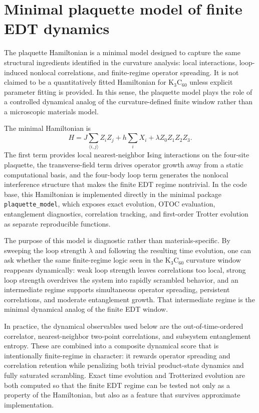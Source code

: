 \section{Minimal plaquette model of finite EDT dynamics}

The plaquette Hamiltonian is a minimal model designed to capture the same structural ingredients identified in the curvature analysis: local interactions, loop-induced nonlocal correlations, and finite-regime operator spreading. It is not claimed to be a quantitatively fitted Hamiltonian for K$_3$C$_{60}$ unless explicit parameter fitting is provided. In this sense, the plaquette model plays the role of a controlled dynamical analog of the curvature-defined finite window rather than a microscopic materials model.

The minimal Hamiltonian is
\begin{equation}
H =
J \sum_{\langle i,j\rangle} Z_i Z_j
+
h \sum_i X_i
+
\lambda Z_0 Z_1 Z_2 Z_3.
\end{equation}
The first term provides local nearest-neighbor Ising interactions on the four-site plaquette, the transverse-field term drives operator growth away from a static computational basis, and the four-body loop term generates the nonlocal interference structure that makes the finite EDT regime nontrivial. In the code base, this Hamiltonian is implemented directly in the minimal package \texttt{plaquette\_model}, which exposes exact evolution, OTOC evaluation, entanglement diagnostics, correlation tracking, and first-order Trotter evolution as separate reproducible functions.

The purpose of this model is diagnostic rather than materials-specific. By sweeping the loop strength $\lambda$ and following the resulting time evolution, one can ask whether the same finite-regime logic seen in the K$_3$C$_{60}$ curvature window reappears dynamically: weak loop strength leaves correlations too local, strong loop strength overdrives the system into rapidly scrambled behavior, and an intermediate regime supports simultaneous operator spreading, persistent correlations, and moderate entanglement growth. That intermediate regime is the minimal dynamical analog of the finite EDT window.

In practice, the dynamical observables used below are the out-of-time-ordered correlator, nearest-neighbor two-point correlations, and subsystem entanglement entropy. These are combined into a composite dynamical score that is intentionally finite-regime in character: it rewards operator spreading and correlation retention while penalizing both trivial product-state dynamics and fully saturated scrambling. Exact time evolution and Trotterized evolution are both computed so that the finite EDT regime can be tested not only as a property of the Hamiltonian, but also as a feature that survives approximate implementation.
